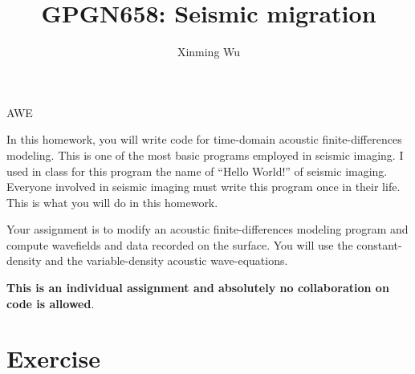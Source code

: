 \author{Xinming Wu}
\title{GPGN658: Seismic migration}{AWE}

In this homework, you will write code for time-domain acoustic
finite-differences modeling. This is one of the most basic programs
employed in seismic imaging. I used in class for this program the name
of ``Hello World!'' of seismic imaging. Everyone involved in seismic
imaging must write this program once in their life. This is what you
will do in this homework.

Your assignment is to modify an acoustic finite-differences modeling
program and compute wavefields and data recorded on the surface. You
will use the constant-density and the variable-density acoustic
wave-equations.

\textbf{This is an individual assignment and absolutely no
  collaboration on code is allowed}.


\section{Exercise}

